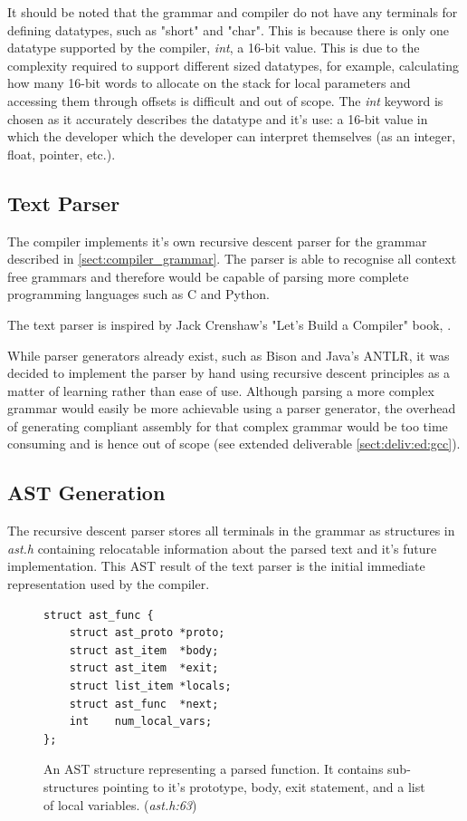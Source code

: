\documentclass[11pt,a4paper]{report}
\begin{document}
It should be noted that the grammar and compiler do not have any terminals for defining datatypes, such as "short" and "char". This is because there is only one datatype supported by the compiler, \textit{int}, a 16-bit value. This is due to the complexity required to support different sized datatypes, for example, calculating how many 16-bit words to allocate on the stack for local parameters and accessing them through offsets is difficult and out of scope. The \textit{int} keyword is chosen as it accurately describes the datatype and it's use: a 16-bit value in which the developer which the developer can interpret themselves (as an integer, float, pointer, etc.).

\subsection{Text Parser}
The compiler implements it's own recursive descent parser for the grammar described in \ref{sect:compiler_grammar}. The parser is able to recognise all context free grammars and therefore would be capable of parsing more complete programming languages such as C and Python. 

The text parser is inspired by Jack Crenshaw's "Let's Build a Compiler" book, \cite{crenshaw1988let}.

While parser generators already exist, such as Bison and Java's ANTLR, it was decided to implement the parser by hand using recursive descent principles as a matter of learning rather than ease of use. Although parsing a more complex grammar would easily be more achievable using a parser generator, the overhead of generating compliant assembly for that complex grammar would be too time consuming and is hence out of scope (see extended deliverable \ref{sect:deliv:ed:gcc}).

\subsection{AST Generation}
\label{sect:compiler_ast}
The recursive descent parser stores all terminals in the grammar as structures in \textit{ast.h} containing relocatable information about the parsed text and it's future implementation. This AST result of the text parser is the initial immediate representation used by the compiler.

\begin{figure}[H]
\centering 
\begin{minipage}{0.4\textwidth}
\begin{verbatim}
struct ast_func {
    struct ast_proto *proto;
    struct ast_item  *body;
    struct ast_item  *exit;
    struct list_item *locals;
    struct ast_func  *next;
    int    num_local_vars;
};
\end{verbatim}
\end{minipage}
\caption{An AST structure representing a parsed function. It contains sub-structures pointing to it's prototype, body, exit statement, and a list of local variables. (\textit{ast.h:63})}
\end{figure}
\end{document}

